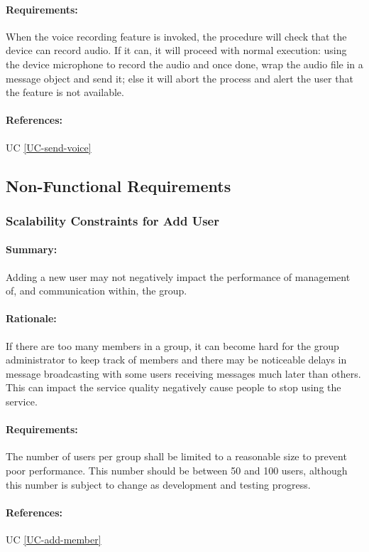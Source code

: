 \documentclass[11pt]{article}
\begin{document}
\paragraph{Requirements:} When the voice recording feature is invoked, the procedure will check that the device can record audio. If it can, it will proceed with normal execution: using the device microphone to record the audio and once done, wrap the audio file in a message object and send it; else it will abort the process and alert the user that the feature is not available.
\paragraph{References:} UC \ref{UC-send-voice}

\subsection{Non-Functional Requirements}

\subsubsection{Scalability Constraints for Add User} \label{NFR-scalability-add-member}
\paragraph{Summary:} Adding a new user may not negatively impact the performance of management of, and communication within, the group.
\paragraph{Rationale:} If there are too many members in a group, it can become hard for the group administrator to keep track of members and there may be noticeable delays in message broadcasting with some users receiving messages much later than others. This can impact the service quality negatively cause people to stop using the service.
\paragraph{Requirements:} The number of users per group shall be limited to a reasonable size to prevent poor performance. This number should be between 50 and 100 users, although this number is subject to change as development and testing progress.
\paragraph{References:} UC \ref{UC-add-member}
\end{document}
